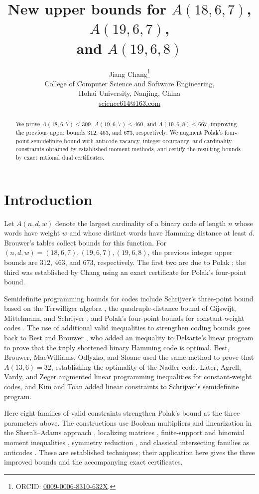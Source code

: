 \documentclass[11pt]{article}
\title{New upper bounds for \texorpdfstring{$A(18,6,7)$, $A(19,6,7)$,\protect\\ and $A(19,6,8)$}{A(18,6,7), A(19,6,7), and A(19,6,8)}}
\author{Jiang Chang\thanks{ORCID: \href{https://orcid.org/0009-0006-8310-632X}{0009-0006-8310-632X}.}\\[3pt]
\small College of Computer Science and Software Engineering,\\
\small Hohai University, Nanjing, China\\
\small\href{mailto:science614@163.com}{science614@163.com}}
\date{}
\begin{document}
\maketitle

\begin{abstract}
We prove $A(18,6,7)\le309$, $A(19,6,7)\le460$, and
$A(19,6,8)\le667$, improving the previous upper bounds
$312$, $463$, and $673$, respectively. We augment Polak's four-point
semidefinite bound with anticode vacancy, integer occupancy, and cardinality
constraints obtained by established moment methods, and certify the resulting
bounds by exact rational dual certificates.
\end{abstract}

\section{Introduction}

Let $A(n,d,w)$ denote the largest cardinality of a binary code of length $n$
whose words have weight $w$ and whose distinct words have Hamming distance at
least $d$. Brouwer's tables \cite{Brouwer} collect bounds for this function.
For $(n,d,w)=(18,6,7),(19,6,7),(19,6,8)$, the previous integer upper bounds
are $312$, $463$, and $673$, respectively. The first two are due to
Polak \cite{Polak}; the third was established by Chang \cite{Chang} using an
exact certificate for Polak's four-point bound.

Semidefinite programming bounds for codes include Schrijver's three-point
bound based on the Terwilliger algebra \cite{Schrijver}, the quadruple-distance
bound of Gijswijt, Mittelmann, and Schrijver \cite{GMS}, and Polak's four-point
bounds for constant-weight codes \cite{Polak}. The use of additional valid
inequalities to strengthen coding bounds goes back to Best and Brouwer
\cite{BestBrouwer}, who added an inequality to Delsarte's linear program to
prove that the triply shortened binary Hamming code is optimal. Best, Brouwer,
MacWilliams, Odlyzko, and Sloane \cite{BestEtAl} used the same method to prove
that $A(13,6)=32$, establishing the optimality of the Nadler code. Later,
Agrell, Vardy, and Zeger \cite{AVZ} augmented linear programming inequalities
for constant-weight codes, and Kim and Toan \cite{KimToan} added linear
constraints to Schrijver's semidefinite program.

Here eight families of valid constraints strengthen Polak's bound at the
three parameters above. The constructions use Boolean multipliers and
linearization in the Sherali--Adams approach \cite{SheraliAdams}, localizing
matrices \cite{Lasserre}, finite-support and binomial moment inequalities
\cite{Prekopa}, symmetry reduction \cite{GatermannParrilo,Polak}, and classical
intersecting families as anticodes \cite{AhlswedeKhachatrian}. These are
established techniques; their application here gives the three improved
bounds and the accompanying exact certificates.
\end{document}
